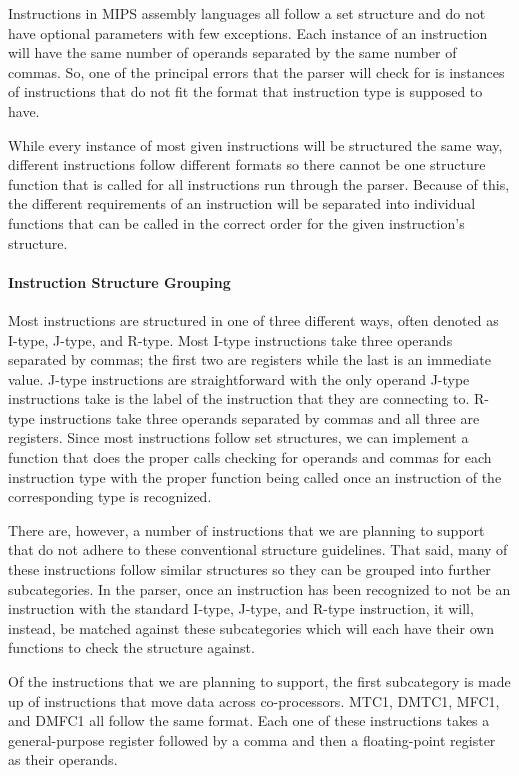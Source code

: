\documentclass[parskip=half, fontsize=12pt]{scrartcl}
\begin{document}
Instructions in MIPS assembly languages all follow a set structure and
do not have optional parameters with few exceptions. Each instance of an
instruction will have the same number of operands separated by the same
number of commas. So, one of the principal errors that the parser will
check for is instances of instructions that do not fit the format that
instruction type is supposed to have.

While every instance of most given instructions will be structured the
same way, different instructions follow different formats so there
cannot be one structure function that is called for all instructions run
through the parser. Because of this, the different requirements of an
instruction will be separated into individual functions that can be
called in the correct order for the given instruction's structure.

\paragraph{Instruction Structure Grouping}

Most instructions are structured in one of three different ways, often
denoted as I-type, J-type, and R-type. Most I-type instructions take
three operands separated by commas; the first two are registers while
the last is an immediate value. J-type instructions are straightforward
with the only operand J-type instructions take is the label of the
instruction that they are connecting to. R-type instructions take three
operands separated by commas and all three are registers. Since most
instructions follow set structures, we can implement a function that
does the proper calls checking for operands and commas for each
instruction type with the proper function being called once an
instruction of the corresponding type is recognized.

There are, however, a number of instructions that we are planning to
support that do not adhere to these conventional structure guidelines.
That said, many of these instructions follow similar structures so they
can be grouped into further subcategories. In the parser, once an
instruction has been recognized to not be an instruction with the
standard I-type, J-type, and R-type instruction, it will, instead, be
matched against these subcategories which will each have their own
functions to check the structure against.

Of the instructions that we are planning to support, the first
subcategory is made up of instructions that move data across
co-processors. MTC1, DMTC1, MFC1, and DMFC1 all follow the same format.
Each one of these instructions takes a general-purpose register followed
by a comma and then a floating-point register as their operands.
\end{document}

